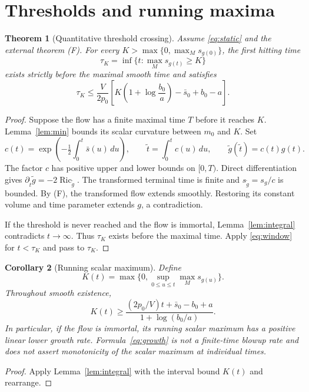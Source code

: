 \documentclass[11pt]{article}
\newtheorem{theorem}{Theorem}
\newtheorem{corollary}[theorem]{Corollary}
\theoremstyle{remark}\newtheorem{remark}[theorem]{Remark}
\newcommand{\Ric}{\operatorname{Ric}}
\begin{document}
\section{Thresholds and running maxima}
\begin{theorem}[Quantitative threshold crossing]\label{thm:hitting}
Assume \eqref{eq:static} and the external theorem (F). For every
$K>\max\{0,\max_Ms_{g(0)}\}$, the first hitting time
\[
 \tau_K=\inf\{t:\max_Ms_{g(t)}\ge K\}
\]
exists strictly before the maximal smooth time and satisfies
\begin{equation}
 \boxed{\displaystyle
 \tau_K\le\frac{V}{2p_0}
 \left[K\left(1+\log\frac{b_0}{a}\right)-\bar s_0+b_0-a\right].}
 \label{eq:hitting}
\end{equation}
\end{theorem}
\begin{proof}
Suppose the flow has a finite maximal time $T$ before it reaches $K$.
Lemma~\ref{lem:min} bounds its scalar curvature between $m_0$ and $K$.
Set
\[
 c(t)=\exp\left(-\tfrac12\int_0^t\bar s(u)\,du\right),
 \qquad \widetilde t=\int_0^t c(u)\,du,
 \qquad\widetilde g(\widetilde t)=c(t)g(t).
\]
The factor $c$ has positive upper and lower bounds on $[0,T)$.
Direct differentiation gives
$\partial_{\widetilde t}\widetilde g=-2\Ric_{\widetilde g}$.
The transformed terminal time is finite and
$s_{\widetilde g}=s_g/c$ is bounded. By (F), the transformed flow
extends smoothly. Restoring its constant volume and time parameter
extends $g$, a contradiction.

If the threshold is never reached and the flow is immortal,
Lemma~\ref{lem:integral} contradicts $t\to\infty$.
Thus $\tau_K$ exists before the maximal time. Apply
\eqref{eq:window} for $t<\tau_K$ and pass to $\tau_K$.
\end{proof}

\begin{corollary}[Running scalar maximum]
Define
\[
 K(t)=\max\{0,\sup_{0\le u\le t}\max_Ms_{g(u)}\}.
\]
Throughout smooth existence,
\begin{equation}
 \boxed{\displaystyle
 K(t)\ge\frac{(2p_0/V)t+\bar s_0-b_0+a}
 {1+\log(b_0/a)}.}\label{eq:growth}
\end{equation}
In particular, if the flow is immortal, its running scalar maximum
has a positive linear lower growth rate. Formula~\eqref{eq:growth}
is not a finite-time blowup rate and does not assert monotonicity of
the scalar maximum at individual times.
\end{corollary}
\begin{proof}
Apply Lemma~\ref{lem:integral} with the interval bound $K(t)$ and
rearrange.
\end{proof}
\end{document}
